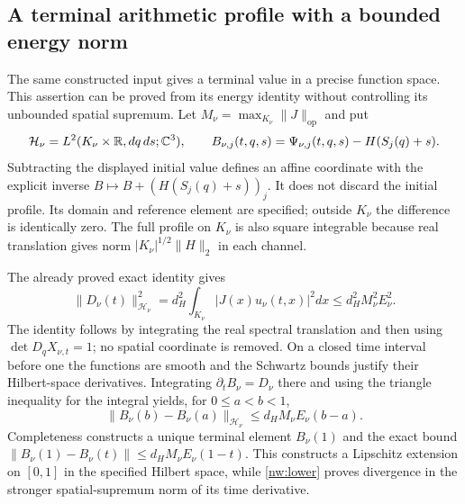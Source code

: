 \subsection*{A terminal arithmetic profile with a bounded energy norm}

The same constructed input gives a terminal value in a precise
function space. This assertion can be proved from its energy identity
without controlling its unbounded spatial supremum. Let
$M_\nu=\max_{K_\nu}\|J\|_{\mathrm{op}}$ and put
\[
 \mathcal H_\nu=L^2(K_\nu\times\mathbb R,dq\,ds;\mathbb C^3),\qquad
 B_{\nu,j}(t,q,s)=\Psi_{\nu,j}(t,q,s)-H(S_j(q)+s).
\]
Subtracting the displayed initial value defines an affine coordinate
with the explicit inverse $B\mapsto B+(H(S_j(q)+s))_j$.
It does not discard the initial profile. Its domain and reference
element are specified; outside $K_\nu$ the difference is identically
zero. The full profile on $K_\nu$ is also square integrable because
real translation gives norm $|K_\nu|^{1/2}\|H\|_2$ in each channel.

The already proved exact identity gives
\[
 \|D_\nu(t)\|_{\mathcal H_\nu}^2
  =d_H^2\int_{K_\nu}|J(x)u_\nu(t,x)|^2dx
  \leq d_H^2M_\nu^2E_\nu^2.
\]
The identity follows by integrating the real spectral translation and
then using $\det D_qX_{\nu,t}=1$; no spatial coordinate is removed.
On a closed time interval before one the functions are smooth and the
Schwartz bounds justify their Hilbert-space derivatives. Integrating
$\partial_tB_\nu=D_\nu$ there and using the triangle inequality for
the integral yields, for $0\leq a<b<1$,
\begin{equation}
 \|B_\nu(b)-B_\nu(a)\|_{\mathcal H_\nu}
       \leq d_H M_\nu E_\nu(b-a).
 \label{nw:terminalrate}
\end{equation}
Completeness constructs a unique terminal element $B_\nu(1)$ and
the exact bound
$\|B_\nu(1)-B_\nu(t)\|\leq d_HM_\nu E_\nu(1-t)$.
This constructs a Lipschitz extension on $[0,1]$ in the specified
Hilbert space, while \eqref{nw:lower} proves divergence in the stronger
spatial-supremum norm of its time derivative.

